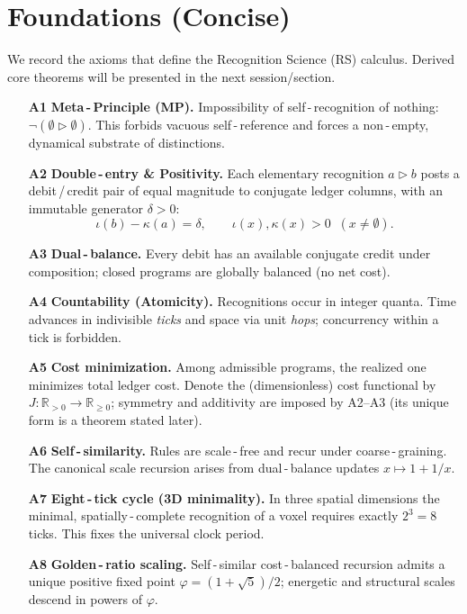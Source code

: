 \documentclass[11pt]{article}
\newcommand{\RR}{\mathbb{R}}
\newcommand{\ph}{\varphi}
\theoremstyle{remark}
\begin{document}
\section{Foundations (Concise)}
We record the axioms that define the Recognition Science (RS) calculus. Derived
core theorems will be presented in the next session/section.

\begin{itemize}
  \item[\textbf{A1}] \textbf{Meta\,\mbox{-}\,Principle (MP).} \;Impossibility of self\,\mbox{-}\,recognition of nothing:
  $\neg(\emptyset \triangleright \emptyset)$. This forbids vacuous self\,\mbox{-}\,reference and forces a non\,\mbox{-}\,empty, dynamical substrate of distinctions.

  \item[\textbf{A2}] \textbf{Double\,\mbox{-}\,entry \& Positivity.} \;Each elementary recognition $a\triangleright b$ posts a
  debit\,/\,credit pair of equal magnitude to conjugate ledger columns, with an immutable
  generator $\delta>0$:
  \[
    \iota(b) - \kappa(a) = \delta, \qquad \iota(x),\kappa(x) > 0 \;\;(x\neq \emptyset).
  \]

  \item[\textbf{A3}] \textbf{Dual\,\mbox{-}\,balance.} \;Every debit has an available conjugate credit under composition; closed
  programs are globally balanced (no net cost).

  \item[\textbf{A4}] \textbf{Countability (Atomicity).} \;Recognitions occur in integer quanta. Time advances in indivisible
  \emph{ticks} and space via unit \emph{hops}; concurrency within a tick is forbidden.

  \item[\textbf{A5}] \textbf{Cost minimization.} \;Among admissible programs, the realized one minimizes total ledger cost.
  Denote the (dimensionless) cost functional by $J: \RR_{>0}\!\to\!\RR_{\ge 0}$; symmetry and additivity are imposed by
  A2--A3 (its unique form is a theorem stated later).

  \item[\textbf{A6}] \textbf{Self\,\mbox{-}\,similarity.} \;Rules are scale\,\mbox{-}\,free and recur under coarse\,\mbox{-}\,graining. The canonical
  scale recursion arises from dual\,\mbox{-}\,balance updates $x \mapsto 1 + 1/x$.

  \item[\textbf{A7}] \textbf{Eight\,\mbox{-}\,tick cycle (3D minimality).} \;In three spatial dimensions the minimal, spatially\,\mbox{-}\,complete
  recognition of a voxel requires exactly $2^{3}=8$ ticks. This fixes the universal clock period.

  \item[\textbf{A8}] \textbf{Golden\,\mbox{-}\,ratio scaling.} \;Self\,\mbox{-}\,similar cost\,\mbox{-}\,balanced recursion admits a unique positive fixed
  point $\ph = (1+\sqrt{5})/2$; energetic and structural scales descend in powers of $\ph$.
\end{itemize}
\end{document}
